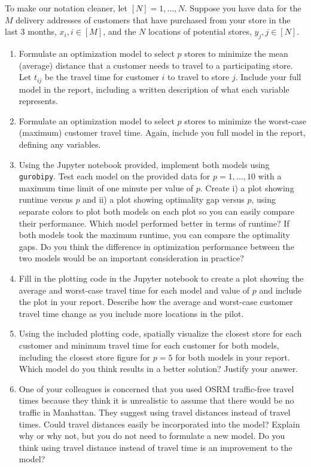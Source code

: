 \documentclass{article}
\begin{document}
To make our notation cleaner, let $[N] = 1, \ldots, N$. Suppose you have data for the $M$ delivery addresses of customers that have purchased from your store in the last 3 months, $x_i, i \in [M]$, and the $N$ locations of potential stores, $y_j, j \in [N]$.

\begin{enumerate}
    \item Formulate an optimization model to select $p$ stores to minimize the mean (average) distance that a customer needs to travel to a participating store. Let $t_{ij}$ be the travel time for customer $i$ to travel to store $j$. Include your full model in the report, including a written description of what each variable represents.

    \item Formulate an optimization model to select $p$ stores to minimize the worst-case (maximum) customer travel time. Again, include you full model in the report, defining any variables. 

    \item Using the Jupyter notebook provided, implement both models using \verb|gurobipy|. Test each model on the provided data for $p = 1, \ldots, 10$ with a maximum time limit of one minute per value of $p$. Create i) a plot showing runtime versus $p$ and ii) a plot showing optimality gap versus $p$, using separate colors to plot both models on each plot so you can easily compare their performance. Which model performed better in terms of runtime? If both models took the maximum runtime, you can compare the optimality gaps. Do you think the difference in optimization performance between the two models would be an important consideration in practice?
    
    \item Fill in the plotting code in the Jupyter notebook to create a plot showing the average and worst-case travel time for each model and value of $p$ and include the plot in your report. Describe how the average and worst-case customer travel time change as you include more locations in the pilot. 
    
    \item Using the included plotting code, spatially visualize the closest store for each customer and minimum travel time for each customer for both models, including the closest store figure for $p = 5$ for both models in your report. Which model do you think results in a better solution? Justify your answer.

    \item One of your colleagues is concerned that you used OSRM traffic-free travel times because they think it is unrealistic to assume that there would be no traffic in Manhattan. They suggest using travel distances instead of travel times. Could travel distances easily be incorporated into the model? Explain why or why not, but you do not need to formulate a new model. Do you think using travel distance instead of travel time is an improvement to the model?
    
\end{enumerate}
\end{document}
